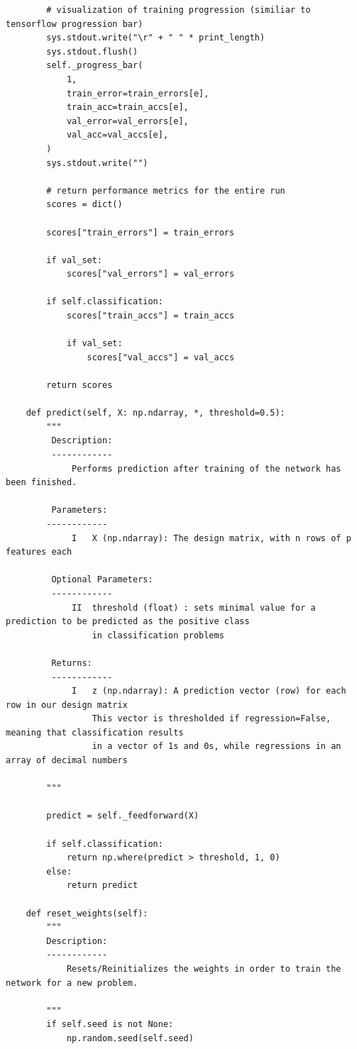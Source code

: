 \documentclass{beamer}
\begin{document}
\begin{frame}
\begin{verbatim}
        # visualization of training progression (similiar to tensorflow progression bar)
        sys.stdout.write("\r" + " " * print_length)
        sys.stdout.flush()
        self._progress_bar(
            1,
            train_error=train_errors[e],
            train_acc=train_accs[e],
            val_error=val_errors[e],
            val_acc=val_accs[e],
        )
        sys.stdout.write("")

        # return performance metrics for the entire run
        scores = dict()

        scores["train_errors"] = train_errors

        if val_set:
            scores["val_errors"] = val_errors

        if self.classification:
            scores["train_accs"] = train_accs

            if val_set:
                scores["val_accs"] = val_accs

        return scores

    def predict(self, X: np.ndarray, *, threshold=0.5):
        """
         Description:
         ------------
             Performs prediction after training of the network has been finished.

         Parameters:
        ------------
             I   X (np.ndarray): The design matrix, with n rows of p features each

         Optional Parameters:
         ------------
             II  threshold (float) : sets minimal value for a prediction to be predicted as the positive class
                 in classification problems

         Returns:
         ------------
             I   z (np.ndarray): A prediction vector (row) for each row in our design matrix
                 This vector is thresholded if regression=False, meaning that classification results
                 in a vector of 1s and 0s, while regressions in an array of decimal numbers

        """

        predict = self._feedforward(X)

        if self.classification:
            return np.where(predict > threshold, 1, 0)
        else:
            return predict

    def reset_weights(self):
        """
        Description:
        ------------
            Resets/Reinitializes the weights in order to train the network for a new problem.

        """
        if self.seed is not None:
            np.random.seed(self.seed)


\end{verbatim}
\end{frame}
\end{document}
